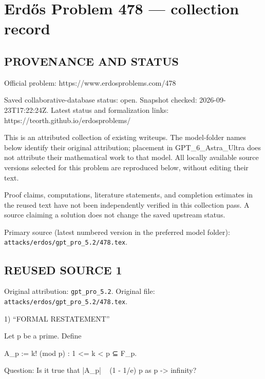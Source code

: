 \section*{Erd\H{o}s Problem 478 --- collection record}

\subsection*{PROVENANCE AND STATUS}
Official problem: https://www.erdosproblems.com/478

Saved collaborative-database status: open.
Snapshot checked: 2026-09-23T17:22:24Z.
Latest status and formalization links: https://teorth.github.io/erdosproblems/

This is an attributed collection of existing writeups. The model-folder names below identify their original attribution; placement in GPT\_6\_Astra\_Ultra does not attribute their mathematical work to that model. All locally available source versions selected for this problem are reproduced below, without editing their text.

Proof claims, computations, literature statements, and completion estimates in the reused text have not been independently verified in this collection pass. A source claiming a solution does not change the saved upstream status.

Primary source (latest numbered version in the preferred model folder): \texttt{attacks/erdos/gpt\_pro\_5.2/478.tex}.

\subsection*{REUSED SOURCE 1}
Original attribution: \texttt{gpt\_pro\_5.2}.
Original file: \texttt{attacks/erdos/gpt\_pro\_5.2/478.tex}.


1) “FORMAL RESTATEMENT”

Let p be a prime. Define

    A_p := { k! (mod p) : 1 <= k < p }  ⊆ F_p.

Question: Is it true that |A_p| ~ (1 - 1/e) p as p -> infinity?

